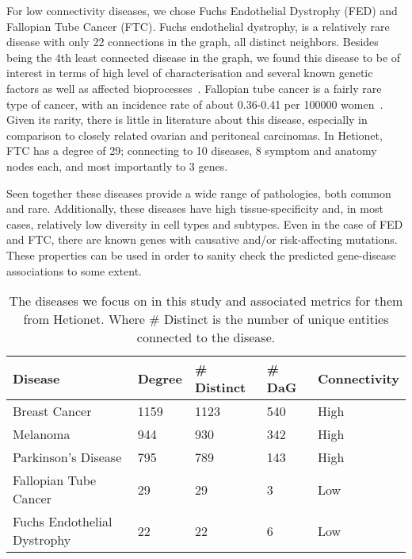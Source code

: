 For low connectivity diseases, we chose Fuchs Endothelial Dystrophy (FED) and Fallopian Tube Cancer (FTC). Fuchs endothelial dystrophy, is a relatively rare disease with only 22 connections in the graph, all distinct neighbors. Besides being the 4th least connected disease in the graph, we found this disease to be of interest in terms of high level of characterisation and several known genetic factors as well as affected bioprocesses~\cite{Eghrari2015Fuchs}. Fallopian tube cancer is a fairly rare type of cancer, with an incidence rate of about 0.36-0.41 per 100000 women~\cite{stasenko2019ftc}. Given its rarity, there is little in literature about this disease, especially in comparison to closely related ovarian and peritoneal carcinomas. In Hetionet, FTC has a degree of 29; connecting to 10 diseases, 8 symptom and anatomy nodes each, and most importantly to 3 genes.

Seen together these diseases provide a wide range of pathologies, both common and rare. Additionally, these diseases have high tissue-specificity and, in most cases, relatively low diversity in cell types and subtypes. Even in the case of FED and FTC, there are known genes with causative and/or risk-affecting mutations. These properties can be used in order to sanity check the predicted gene-disease associations to some extent.

\begin{table*}[ht!]

	\centering
	\begin{tabular}{p{}  C{0.1\textwidth}  C{0.15\textwidth} C{0.15\textwidth} C{0.15\textwidth}}
		\toprule
		\textbf{Disease}            & \textbf{Degree} & \textbf{\# Distinct} & \textbf{\# DaG} & \textbf{Connectivity} \\
		\midrule \midrule
		Breast Cancer               & 1159            & 1123                 & 540             & High                  \\
		Melanoma                    & 944             & 930                  & 342             & High                  \\
		Parkinson's Disease         & 795             & 789                  & 143             & High                  \\
		\midrule
		Fallopian Tube Cancer       & 29              & 29                   & 3               & Low                   \\
		Fuchs Endothelial Dystrophy & 22              & 22                   & 6               & Low                   \\
		\bottomrule
	\end{tabular}
	\vspace{5pt}
	\caption{The diseases we focus on in this study and associated metrics for them from Hetionet. Where \# Distinct is the number of unique entities connected to the disease.}
	\label{tab:disease}
\end{table*}

